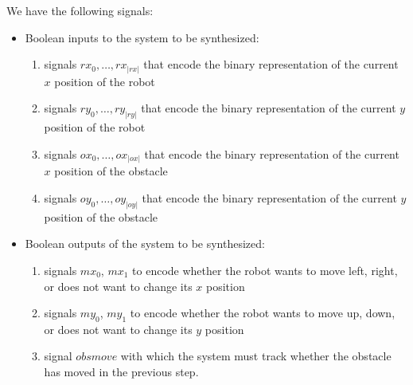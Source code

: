 \documentclass[a4paper,conference,10pt]{IEEEtran}
\begin{document}
\noindent We have the following signals:
\begin{itemize}
\item Boolean inputs to the system to be synthesized:
\begin{enumerate}
\item signals $\mathit{rx}_0, \ldots, \mathit{rx}_{|\mathit{rx}|}$ that encode the binary representation of the current $x$ position of the robot 
\item signals $\mathit{ry}_0, \ldots, \mathit{ry}_{|\mathit{ry}|}$ that encode the binary representation of the current $y$ position of the robot
\item signals $\mathit{ox}_0, \ldots, \mathit{ox}_{|\mathit{ox}|}$ that encode the binary representation of the current $x$ position of the obstacle
\item signals $\mathit{oy}_0, \ldots, \mathit{oy}_{|\mathit{oy}|}$ that encode the binary representation of the current $y$ position of the obstacle
\end{enumerate}
\item Boolean outputs of the system to be synthesized:
\begin{enumerate}
\item signals $\mathit{mx}_0$, $\mathit{mx}_1$ to encode whether the robot wants to move left, right, or does not want to change its $x$ position
\item signals $\mathit{my}_0$, $\mathit{my}_1$ to encode whether the robot wants to move up, down, or does not want to change its $y$ position
\item signal $\mathit{obsmove}$ with which the system must track whether the obstacle has moved in the previous step.
\end{enumerate}
\end{itemize}
\end{document}
